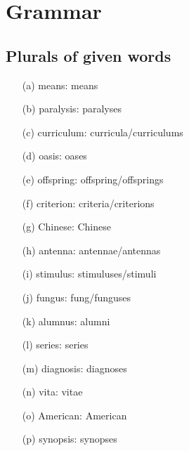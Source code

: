 \documentclass[paper=a4, fontsize=11pt]{scrartcl} %
\numberwithin{equation}{section} %
\numberwithin{figure}{section} %
\numberwithin{table}{section} %
\begin{document}
\section{Grammar}
	\subsection{Plurals of given words}
		\begin{enumerate}
			\item[(a)] means: means
			\item[(b)] paralysis: paralyses
			\item[(c)] curriculum: curricula/curriculums
			\item[(d)] oasis: oases
			\item[(e)] offspring: offspring/offsprings
			\item[(f)] criterion: criteria/criterions
			\item[(g)] Chinese: Chinese
			\item[(h)] antenna: antennae/antennas
			\item[(i)] stimulus: stimuluses/stimuli
			\item[(j)] fungus: fung/funguses
			\item[(k)] alumnus: alumni
			\item[(l)] series: series
			\item[(m)] diagnosis: diagnoses
			\item[(n)] vita: vitae
			\item[(o)] American: American
			\item[(p)] synopsis: synopses
		\end{enumerate}
	
\end{document}
